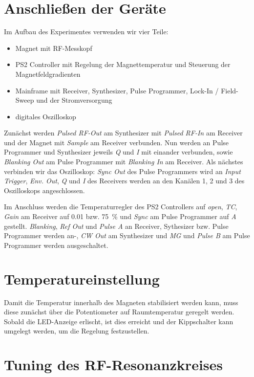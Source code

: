 \section{Anschließen der Geräte}

Im Aufbau des Experimentes verwenden wir vier Teile:

\begin{itemize}
    \item
        Magnet mit RF-Messkopf
    \item
        PS2 Controller mit Regelung der Magnettemperatur und Steuerung der
        Magnetfeldgradienten
    \item
        Mainframe mit Receiver, Synthesizer, Pulse Programmer, Lock-In /
        Field-Sweep und der Stromversorgung
    \item
        digitales Oszilloskop
\end{itemize}

Zunächst werden \emph{Pulsed RF-Out} am Synthesizer mit \emph{Pulsed RF-In} am
Receiver und der Magnet mit \emph{Sample} am Receiver verbunden. Nun werden an
Pulse Programmer und Synthesizer jeweils \emph{Q} und \emph{I} mit einander
verbunden, sowie \emph{Blanking Out} am Pulse Programmer mit \emph{Blanking In}
am Receiver. Als nächstes verbinden wir das Oszilloskop: \emph{Sync Out} des
Pulse Programmers wird an \emph{Input Trigger}, \emph{Env. Out}, \emph{Q} und
\emph{I} des Receivers werden an den Kanälen 1, 2 und 3 des Oszilloskops
angeschlossen.

Im Anschluss werden die Temperaturregler des PS2 Controllers auf \emph{open},
\emph{TC}, \emph{Gain} am Receiver auf \num{0.01} bzw. \SI{75}{\percent} und
\emph{Sync} am Pulse Programmer auf \emph{A} gestellt. \emph{Blanking},
\emph{Ref Out} und \emph{Pulse A} an Receiver, Sythesizer bzw. Pulse Programmer
werden an-, \emph{CW Out} am Synthesizer und \emph{MG} und \emph{Pulse B} am
Pulse Programmer werden ausgeschaltet. 

\section{Temperatureinstellung}

Damit die Temperatur innerhalb des Magneten stabilisiert werden kann, muss
diese zunächst über die Potentiometer auf Raumtemperatur geregelt werden.
Sobald die LED-Anzeige erlischt, ist dies erreicht und der Kippschalter kann
umgelegt werden, um die Regelung festzustellen.

\section{Tuning des RF-Resonanzkreises}

